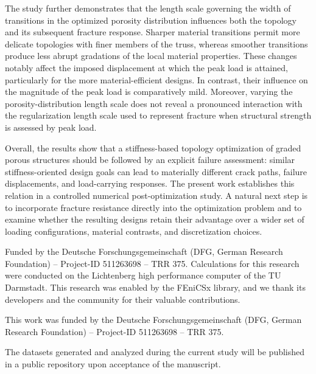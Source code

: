 \documentclass[
	pdflatex,
	sn-mathphys-num
]{sn-jnl}
\theoremstyle{thmstyleone}%
\theoremstyle{thmstyletwo}%
\theoremstyle{thmstylethree}%
\begin{document}
The study further demonstrates that the length scale governing
the width of transitions in the optimized porosity distribution
influences both the topology and its subsequent fracture
response. Sharper material transitions permit more delicate
topologies with finer members of the truss, whereas smoother
transitions produce less abrupt gradations of the local material
properties. These changes notably affect the imposed
displacement at which the peak load is attained, particularly
for the more material-efficient designs. In contrast, their
influence on the magnitude of the peak load is comparatively
mild. Moreover, varying the porosity-distribution length scale
does not reveal a pronounced interaction with the regularization
length scale used to represent fracture when structural
strength is assessed by peak load.

Overall, the results show that a stiffness-based topology
optimization of graded porous structures should be followed by
an explicit failure assessment: similar stiffness-oriented
design goals can lead to materially different crack paths,
failure displacements, and load-carrying responses. The present
work establishes this relation in a controlled numerical
post-optimization study. A natural next step is to incorporate
fracture resistance directly into the optimization problem and
to examine whether the resulting designs retain their advantage
over a wider set of loading configurations, material contrasts,
and discretization choices.

\backmatter


Funded by the Deutsche Forschungsgemeinschaft (DFG, German
Research Foundation) – Project-ID 511263698 – TRR 375.
Calculations for this research were conducted on the Lichtenberg
high performance computer of the TU Darmstadt.
This research was enabled by the FEniCSx library, and we thank
its developers and the community for their valuable
contributions.


This work was funded by the Deutsche Forschungsgemeinschaft
(DFG, German Research Foundation) -- Project-ID 511263698 --
TRR 375.

 The datasets generated and analyzed
during the current study will be published in a public
repository upon acceptance of the manuscript.




\end{document}
